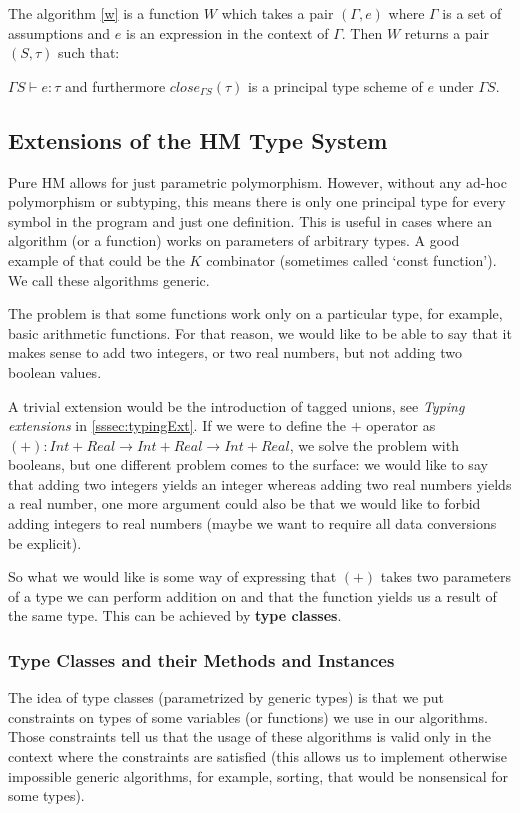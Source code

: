 The algorithm \ref{w} is a function $W$ which takes a pair $(\Gamma, e)$ where $\Gamma$ is a set of assumptions and $e$ is an expression in the context of $\Gamma$. Then $W$ returns a pair $(S, \tau)$ such that:

$\Gamma S \vdash e : \tau$ and furthermore $close_{\Gamma S}(\tau)$ is a principal type scheme of $e$ under $\Gamma S$.

\subsection{Extensions of the HM Type System}

Pure HM allows for just parametric polymorphism. However, without any ad-hoc polymorphism or subtyping, this means there is only one principal type for every symbol in the program and just one definition. This is useful in cases where an algorithm (or a function) works on parameters of arbitrary types. A good example of that could be the $K$ combinator (sometimes called `const function'). We call these algorithms generic.

The problem is that some functions work only on a particular type, for example, basic arithmetic functions. For that reason, we would like to be able to say that it makes sense to add two integers, or two real numbers, but not adding two boolean values.

A trivial extension would be the introduction of tagged unions, see \emph{Typing extensions} in \ref{sssec:typingExt}. If we were to define the $+$ operator as $(+) : Int + Real \rightarrow Int + Real \rightarrow Int + Real$, we solve the problem with booleans, but one different problem comes to the surface: we would like to say that adding two integers yields an integer whereas adding two real numbers yields a real number, one more argument could also be that we would like to forbid adding integers to real numbers (maybe we want to require all data conversions be explicit).

So what we would like is some way of expressing that $(+)$ takes two parameters of a type we can perform addition on and that the function yields us a result of the same type. This can be achieved by \textbf{type classes}.

\subsubsection{Type Classes and their Methods and Instances}

The idea of type classes (parametrized by generic types) is that we put constraints on types of some variables (or functions) we use in our algorithms. Those constraints tell us that the usage of these algorithms is valid only in the context where the constraints are satisfied (this allows us to implement otherwise impossible generic algorithms, for example, sorting, that would be nonsensical for some types).

